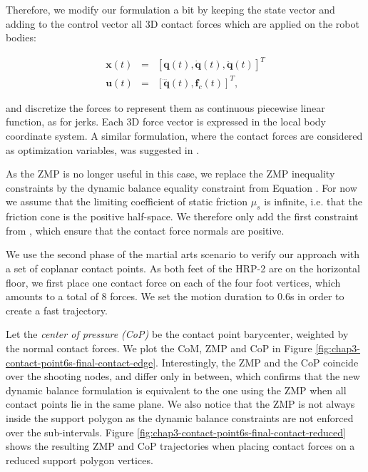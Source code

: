Therefore, we modify our formulation a bit by keeping the state vector
and adding to the control vector all 3D contact forces which are
applied on the robot bodies:

\begin{equation}
  \begin{array}{rcl}
  \mathbf{x}(t) & = & [\mathbf{q}(t), \mathbf{\dot{q}}(t), \mathbf{\ddot{q}}(t)]^T \\
  \mathbf{u}(t) & = & [\mathbf{\dddot{q}}(t), \mathbf{f}_c(t)]^T,
  \end{array}
  \label{variables-contact-point}
\end{equation}

and discretize the forces to represent them as continuous piecewise
linear function, as for jerks. Each 3D force vector is expressed in
the local body coordinate system. A similar formulation, where the
contact forces are considered as optimization variables, was suggested
in \cite{saab-tro-12}.

As the ZMP is no longer useful in this case, we replace the ZMP
inequality constraints by the dynamic balance equality constraint from
Equation . For now we assume
that the limiting coefficient of static friction $\mu_s$ is infinite,
i.e. that the friction cone is the positive half-space. We therefore
only add the first constraint from , which
ensure that the contact force normals are positive.

We use the second phase of the martial arts scenario to verify our
approach with a set of coplanar contact points. As both feet of the
HRP-2 are on the horizontal floor, we first place one contact force on
each of the four foot vertices, which amounts to a total of 8
forces. We set the motion duration to $0.6$s in order to create a fast
trajectory.

Let the \emph{center of pressure (CoP)} be the contact point
barycenter, weighted by the normal contact forces. We plot the CoM,
ZMP and CoP in Figure
\ref{fig:chap3-contact-point6s-final-contact-edge}. Interestingly, the
ZMP and the CoP coincide over the shooting nodes, and differ only in
between, which confirms that the new dynamic balance formulation is
equivalent to the one using the ZMP when all contact points lie in the
same plane. We also notice that the ZMP is not always inside the support
polygon as the dynamic balance constraints are not enforced over the
sub-intervals. Figure
\ref{fig:chap3-contact-point6s-final-contact-reduced} shows the
resulting ZMP and CoP trajectories when placing contact forces on a
reduced support polygon vertices.

